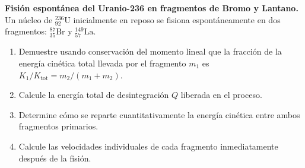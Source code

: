 \item \textbf{Fisión espontánea del Uranio-236 en fragmentos de Bromo y Lantano.}
Un núcleo de $^{236}_{92}\text{U}$ inicialmente en reposo se fisiona espontáneamente en dos fragmentos: $^{87}_{35}\text{Br}$ y $^{149}_{57}\text{La}$.
\begin{enumerate}
    \item Demuestre usando conservación del momento lineal que la fracción de la energía cinética total llevada por el fragmento $m_1$ es $K_1/K_{\text{tot}} = m_2 / (m_1 + m_2)$.
    \item Calcule la energía total de desintegración $Q$ liberada en el proceso.
    \item Determine cómo se reparte cuantitativamente la energía cinética entre ambos fragmentos primarios.
    \item Calcule las velocidades individuales de cada fragmento inmediatamente después de la fisión.
\end{enumerate}